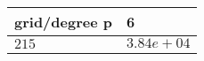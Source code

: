 \begin{tabular}{ll}
\hline
 grid/degree p   & 6          \\
\hline
 $215$           & $3.84e+04$ \\
\hline
\end{tabular}